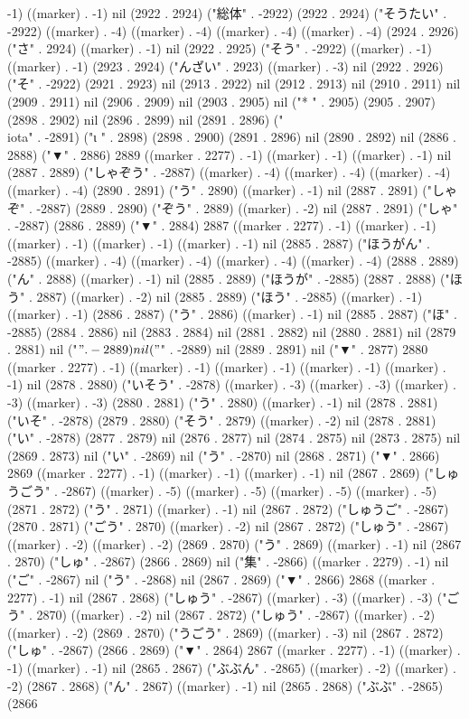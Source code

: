 -1) ((marker) . -1) nil (2922 . 2924) ("総体" . -2922) (2922 . 2924) ("そうたい" . -2922) ((marker) . -4) ((marker) . -4) ((marker) . -4) ((marker) . -4) (2924 . 2926) ("さ" . 2924) ((marker) . -1) nil (2922 . 2925) ("そう" . -2922) ((marker) . -1) ((marker) . -1) (2923 . 2924) ("んざい" . 2923) ((marker) . -3) nil (2922 . 2926) ("そ" . -2922) (2921 . 2923) nil (2913 . 2922) nil (2912 . 2913) nil (2910 . 2911) nil (2909 . 2911) nil (2906 . 2909) nil (2903 . 2905) nil ("*
" . 2905) (2905 . 2907) (2898 . 2902) nil (2896 . 2899) nil (2891 . 2896) ("\\iota" . -2891) ("ι
" . 2898) (2898 . 2900) (2891 . 2896) nil (2890 . 2892) nil (2886 . 2888) ("▼" . 2886) 2889 ((marker . 2277) . -1) ((marker) . -1) ((marker) . -1) nil (2887 . 2889) ("しゃぞう" . -2887) ((marker) . -4) ((marker) . -4) ((marker) . -4) ((marker) . -4) (2890 . 2891) ("う" . 2890) ((marker) . -1) nil (2887 . 2891) ("しゃぞ" . -2887) (2889 . 2890) ("ぞう" . 2889) ((marker) . -2) nil (2887 . 2891) ("しゃ" . -2887) (2886 . 2889) ("▼" . 2884) 2887 ((marker . 2277) . -1) ((marker) . -1) ((marker) . -1) ((marker) . -1) ((marker) . -1) nil (2885 . 2887) ("ほうがん" . -2885) ((marker) . -4) ((marker) . -4) ((marker) . -4) ((marker) . -4) (2888 . 2889) ("ん" . 2888) ((marker) . -1) nil (2885 . 2889) ("ほうが" . -2885) (2887 . 2888) ("ほう" . 2887) ((marker) . -2) nil (2885 . 2889) ("ほう" . -2885) ((marker) . -1) ((marker) . -1) (2886 . 2887) ("う" . 2886) ((marker) . -1) nil (2885 . 2887) ("ほ" . -2885) (2884 . 2886) nil (2883 . 2884) nil (2881 . 2882) nil (2880 . 2881) nil (2879 . 2881) nil ("$" . -2889) nil ("$" . -2889) nil (2889 . 2891) nil ("▼" . 2877) 2880 ((marker . 2277) . -1) ((marker) . -1) ((marker) . -1) ((marker) . -1) ((marker) . -1) nil (2878 . 2880) ("いそう" . -2878) ((marker) . -3) ((marker) . -3) ((marker) . -3) ((marker) . -3) (2880 . 2881) ("う" . 2880) ((marker) . -1) nil (2878 . 2881) ("いそ" . -2878) (2879 . 2880) ("そう" . 2879) ((marker) . -2) nil (2878 . 2881) ("い" . -2878) (2877 . 2879) nil (2876 . 2877) nil (2874 . 2875) nil (2873 . 2875) nil (2869 . 2873) nil ("い" . -2869) nil ("う" . -2870) nil (2868 . 2871) ("▼" . 2866) 2869 ((marker . 2277) . -1) ((marker) . -1) ((marker) . -1) nil (2867 . 2869) ("しゅうごう" . -2867) ((marker) . -5) ((marker) . -5) ((marker) . -5) ((marker) . -5) (2871 . 2872) ("う" . 2871) ((marker) . -1) nil (2867 . 2872) ("しゅうご" . -2867) (2870 . 2871) ("ごう" . 2870) ((marker) . -2) nil (2867 . 2872) ("しゅう" . -2867) ((marker) . -2) ((marker) . -2) (2869 . 2870) ("う" . 2869) ((marker) . -1) nil (2867 . 2870) ("しゅ" . -2867) (2866 . 2869) nil ("集" . -2866) ((marker . 2279) . -1) nil ("ご" . -2867) nil ("う" . -2868) nil (2867 . 2869) ("▼" . 2866) 2868 ((marker . 2277) . -1) nil (2867 . 2868) ("しゅう" . -2867) ((marker) . -3) ((marker) . -3) ("ごう" . 2870) ((marker) . -2) nil (2867 . 2872) ("しゅう" . -2867) ((marker) . -2) ((marker) . -2) (2869 . 2870) ("うごう" . 2869) ((marker) . -3) nil (2867 . 2872) ("しゅ" . -2867) (2866 . 2869) ("▼" . 2864) 2867 ((marker . 2277) . -1) ((marker) . -1) ((marker) . -1) nil (2865 . 2867) ("ぶぶん" . -2865) ((marker) . -2) ((marker) . -2) (2867 . 2868) ("ん" . 2867) ((marker) . -1) nil (2865 . 2868) ("ぶぶ" . -2865) (2866 